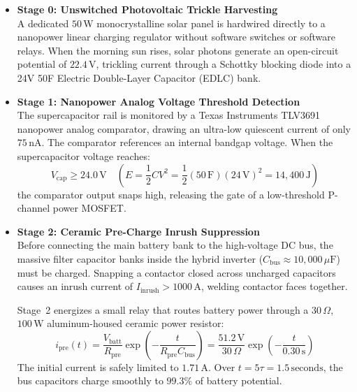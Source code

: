 \begin{itemize}
    \item \textbf{Stage 0: Unswitched Photovoltaic Trickle Harvesting} \\
    A dedicated $50\,\mathrm{W}$ monocrystalline solar panel is hardwired directly to a nanopower linear charging regulator without software switches or software relays. When the morning sun rises, solar photons generate an open-circuit potential of $22.4\,\mathrm{V}$, trickling current through a Schottky blocking diode into a 24V 50F Electric Double-Layer Capacitor (EDLC) bank.
    
    \item \textbf{Stage 1: Nanopower Analog Voltage Threshold Detection} \\
    The supercapacitor rail is monitored by a Texas Instruments TLV3691 nanopower analog comparator, drawing an ultra-low quiescent current of only $75\,\mathrm{nA}$. The comparator references an internal bandgap voltage. When the supercapacitor voltage reaches:
    \begin{equation}
    V_{\mathrm{cap}} \ge 24.0\,\mathrm{V} \quad \left( E = \frac{1}{2} C V^2 = \frac{1}{2} (50\,\mathrm{F})(24\,\mathrm{V})^2 = 14,400\,\mathrm{J} \right)
    \label{eq:supercap_energy}
    \end{equation}
    the comparator output snaps high, releasing the gate of a low-threshold P-channel power MOSFET.
    
    \item \textbf{Stage 2: Ceramic Pre-Charge Inrush Suppression} \\
    Before connecting the main battery bank to the high-voltage DC bus, the massive filter capacitor banks inside the hybrid inverter ($C_{\mathrm{bus}} \approx 10,000\,\mu\mathrm{F}$) must be charged. Snapping a contactor closed across uncharged capacitors causes an inrush current of $I_{\mathrm{inrush}} > 1000\,\mathrm{A}$, welding contactor faces together. 
    
    Stage~2 energizes a small relay that routes battery power through a $30\,\Omega$, $100\,\mathrm{W}$ aluminum-housed ceramic power resistor:
    \begin{equation}
    i_{\mathrm{pre}}(t) = \frac{V_{\mathrm{batt}}}{R_{\mathrm{pre}}} \exp\left( -\frac{t}{R_{\mathrm{pre}} C_{\mathrm{bus}}} \right) = \frac{51.2\,\mathrm{V}}{30\,\Omega} \exp\left( -\frac{t}{0.30\,\mathrm{s}} \right)
    \label{eq:precharge_decay}
    \end{equation}
    The initial current is safely limited to $1.71\,\mathrm{A}$. Over $t = 5\tau = 1.5\,\mathrm{seconds}$, the bus capacitors charge smoothly to $99.3\%$ of battery potential.
    

\end{itemize}
